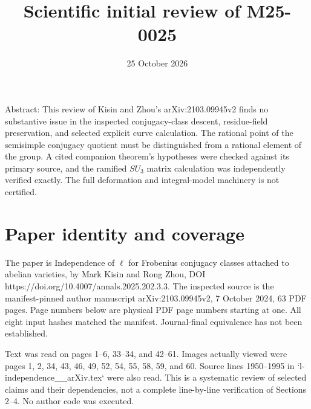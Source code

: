 \documentclass[10pt]{article}
\title{Scientific initial review of M25-0025}
\author{}
\date{25 October 2026}
\begin{document}
\maketitle
Abstract: This review of Kisin and Zhou’s arXiv:2103.09945v2 finds no substantive issue in the inspected conjugacy-class descent, residue-field preservation, and selected explicit curve calculation. The rational point of the semisimple conjugacy quotient must be distinguished from a rational element of the group. A cited companion theorem’s hypotheses were checked against its primary source, and the ramified \(SU_3\) matrix calculation was independently verified exactly. The full deformation and integral-model machinery is not certified.\par
\section*{Paper identity and coverage}
The paper is Independence of \(\ell\) for Frobenius conjugacy classes attached to abelian varieties, by Mark Kisin and Rong Zhou, DOI https://doi.org/10.4007/annals.2025.202.3.3. The inspected source is the manifest-pinned author manuscript arXiv:2103.09945v2, 7 October 2024, 63 PDF pages. Page numbers below are physical PDF page numbers starting at one. All eight input hashes matched the manifest. Journal-final equivalence has not been established.\par
Text was read on pages 1–6, 33–34, and 42–61. Images actually viewed were pages 1, 2, 34, 43, 46, 49, 52, 54, 55, 58, 59, and 60. Source lines 1950–1995 in `l-independence\_\_arXiv.tex` were also read. This is a systematic review of selected claims and their dependencies, not a complete line-by-line verification of Sections 2–4. No author code was executed.\par
\end{document}
